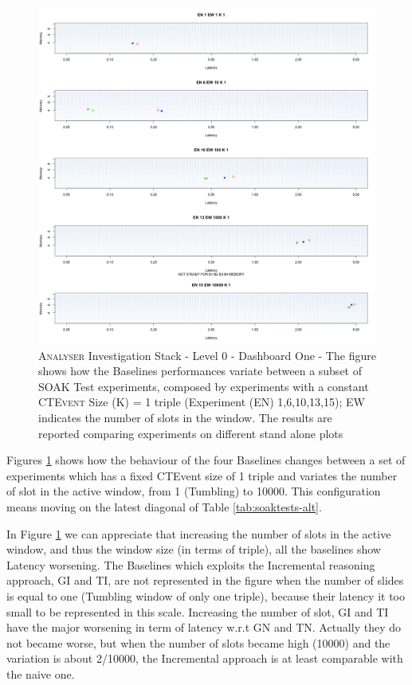\begin{figure}[t!hb]
	\centering
	\includegraphics[width=\linewidth]{images/dashboard-1-split}	
	\caption[\textsc{Analyser} Investigation Stack - Level 0 - Dashboard One - Split Version]{\textsc{Analyser} Investigation Stack - Level 0 - Dashboard One - The figure shows how the Baselines performances variate between a subset of SOAK Test experiments, composed by experiments with a constant \textsc{CTEvent} Size (K) = 1 triple (Experiment (EN) 1,6,10,13,15); EW indicates the number of slots in the window. The results are reported comparing experiments on different stand alone plots} 
	\label{fig:result_dashboard_ka}
\end{figure}

Figures \ref{fig:result_dashboard_ka} shows how the behaviour of the four Baselines changes between a set of experiments which has a fixed CTEvent size of 1 triple and variates the number of slot in the active window, from 1 (Tumbling) to 10000. This configuration means moving on the latest diagonal of Table \ref{tab:soaktests-alt}.

In Figure \ref{fig:result_dashboard_ka} we can appreciate that increasing the number of slots in the active window, and thus the window size (in terms of triple), all the baselines show Latency worsening. The Baselines which exploits the Incremental reasoning approach, GI and TI, are not represented in the figure when the number of slides is equal to one (Tumbling window of only one triple), because their latency it too small to be represented in this scale. Increasing the number of slot, GI and TI have the major worsening in term of latency w.r.t GN and TN. Actually they do not became worse, but when the number of slots became high (10000) and the variation is about 2/10000, the Incremental approach is at least comparable with the naive one.

